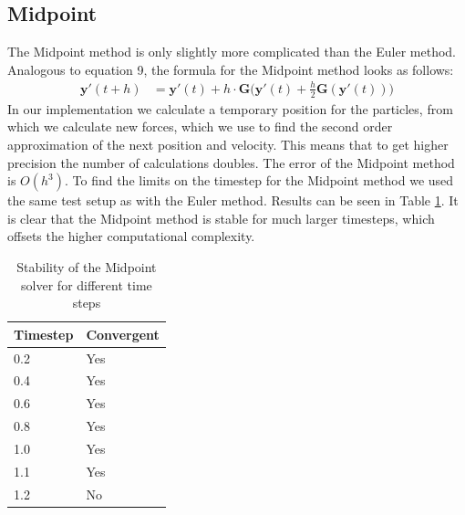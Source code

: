 \documentclass[a4paper,twoside,11pt,twocolumn]{article}
\begin{document}
\subsection{Midpoint}
The Midpoint method is only slightly more complicated than the Euler method. Analogous to equation 9, the formula for the Midpoint method looks as follows:
\begin{align}
	\mathbf{y}'(t+h) &= \mathbf{y}'(t) + h\cdot \mathbf{G}\biggl(\mathbf{y}'(t)+\frac{h}{2}\mathbf{G}(\mathbf{y}'(t))\biggr)
\end{align}
In our implementation we calculate a temporary position for the particles, from which we calculate new forces, which we use to find the second order approximation of the next position and velocity. This means that to get higher precision the number of calculations doubles. The error of the Midpoint method is $O(h^3)$.
To find the limits on the timestep for the Midpoint method we used the same test setup as with the Euler method. Results can be seen in Table \ref{Midpoint}. It is clear that the Midpoint method is stable for much larger timesteps, which offsets the higher computational complexity.
\begin{table}[h]
	\caption{Stability of the Midpoint solver for different time steps}
	\label{Midpoint}
	\begin{tabular}{|l|l|}
		\hline
		\textbf{Timestep} & \textbf{Convergent} \\ \hline
		0.2               & Yes                 \\ \hline
		0.4               & Yes                 \\ \hline
		0.6               & Yes                 \\ \hline
		0.8               & Yes                 \\ \hline
		1.0               & Yes                 \\ \hline
		1.1               & Yes                 \\ \hline
		1.2               & No                  \\ \hline
	\end{tabular}
\end{table}
\end{document}
